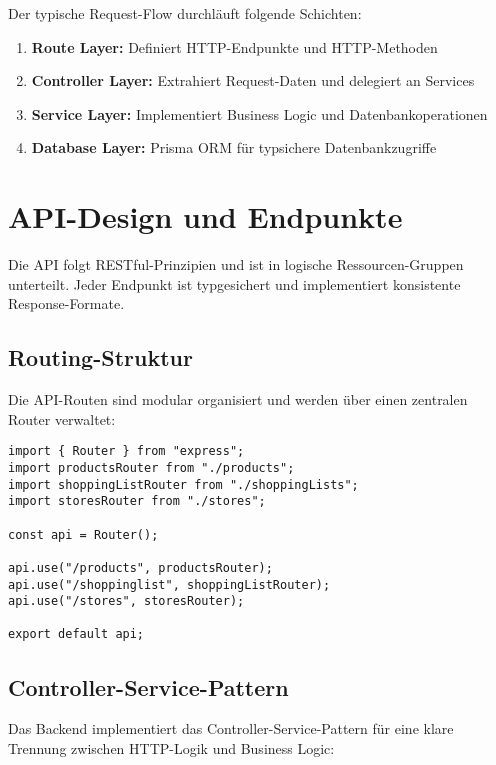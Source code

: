 Der typische Request-Flow durchläuft folgende Schichten:

\begin{enumerate}
    \item \textbf{Route Layer:} Definiert HTTP-Endpunkte und HTTP-Methoden
    \item \textbf{Controller Layer:} Extrahiert Request-Daten und delegiert an Services
    \item \textbf{Service Layer:} Implementiert Business Logic und Datenbankoperationen
    \item \textbf{Database Layer:} Prisma ORM für typsichere Datenbankzugriffe
\end{enumerate}

\section{API-Design und Endpunkte}

Die API folgt RESTful-Prinzipien und ist in logische Ressourcen-Gruppen unterteilt. Jeder Endpunkt ist typgesichert und implementiert konsistente Response-Formate.

\subsection{Routing-Struktur}

Die API-Routen sind modular organisiert und werden über einen zentralen Router verwaltet:

\begin{lstlisting}[style=typescriptstyle,caption={Zentraler API-Router}]
import { Router } from "express";
import productsRouter from "./products";
import shoppingListRouter from "./shoppingLists";
import storesRouter from "./stores";

const api = Router();

api.use("/products", productsRouter);
api.use("/shoppinglist", shoppingListRouter);
api.use("/stores", storesRouter);

export default api;
\end{lstlisting}

\subsection{Controller-Service-Pattern}

Das Backend implementiert das Controller-Service-Pattern für eine klare Trennung zwischen HTTP-Logik und Business Logic:

